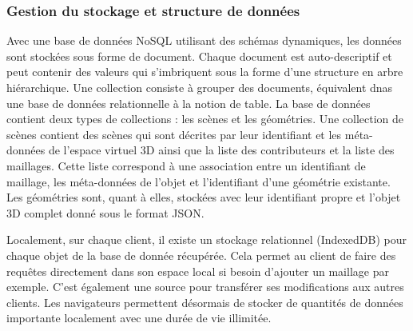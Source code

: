 %
%
%
%
%
\subsubsection{Gestion du stockage et structure de données}

Avec une base de données NoSQL utilisant des schémas dynamiques, les 
données sont stockées sous forme de document. Chaque document est 
auto-descriptif et peut contenir des valeurs qui s'imbriquent sous la forme d'une 
structure en arbre hiérarchique. Une collection consiste à grouper des documents, 
équivalent dnas une base de données relationnelle à la notion de table. La base de 
données contient deux types de collections : les scènes et les géométries. Une 
collection de scènes contient des scènes qui sont décrites par leur identifiant et 
les méta-données de l'espace virtuel 3D ainsi que la liste des contributeurs et la 
liste des maillages. Cette liste correspond à une association entre un identifiant de 
maillage, les méta-données de l'objet et l'identifiant d'une géométrie existante. 
Les géométries sont, quant à elles, stockées avec leur identifiant propre et l'objet 
3D complet donné sous le format \gls{JSON}.

Localement, sur chaque client, il existe un stockage relationnel (IndexedDB) pour 
chaque objet 
de la base de donnée récupérée. Cela permet au client de faire des requêtes 
directement dans son espace local si besoin d'ajouter un maillage par exemple. 
C'est également une source pour transférer ses modifications aux autres clients.
Les navigateurs permettent désormais de stocker de quantités de données 
importante localement avec une durée de vie illimitée. 

